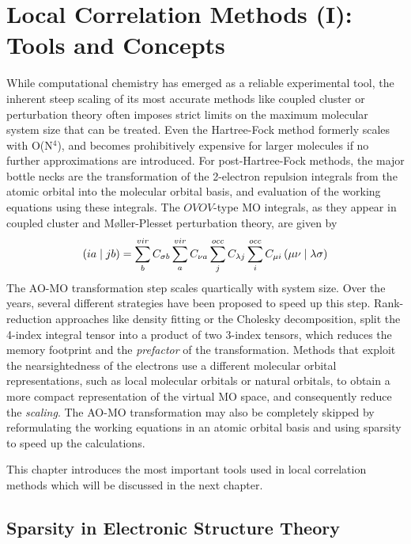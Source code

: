 \chapter{Local Correlation Methods (I): Tools and Concepts \label{cha:LOCAL0}}

While computational chemistry has emerged as a reliable experimental tool, the inherent steep scaling of its most accurate methods like coupled cluster or perturbation theory often imposes strict limits on the maximum molecular system size that can be treated. Even the Hartree-Fock method formerly scales with O(N$^4$), and becomes prohibitively expensive for larger molecules if no further approximations are introduced. For post-Hartree-Fock methods, the major bottle necks are the transformation of the 2-electron repulsion integrals from the atomic orbital into the molecular orbital basis, and evaluation of the working equations using these integrals. The $OVOV$-type MO integrals, as they appear in coupled cluster and M{\o}ller-Plesset perturbation theory, are given by
\begin{equation}
\left( ia \mid jb \right) = \sum^{vir}_b C_{\sigma b} \sum^{vir}_a C_{\nu a} \sum^{occ}_j C_{\lambda j} \sum^{occ}_i C_{\mu i} \left( \mu\nu \mid \lambda\sigma \right)
\end{equation}
The AO-MO transformation step scales quartically with system size. Over the years, several different strategies have been proposed to speed up this step. Rank-reduction approaches like density fitting or the Cholesky decomposition, split the 4-index integral tensor into a product of two 3-index tensors, which reduces the memory footprint and the \emph{prefactor} of the transformation. Methods that exploit the nearsightedness of the electrons use a different molecular orbital representations, such as local molecular orbitals or natural orbitals, to obtain a more compact representation of the virtual MO space, and consequently reduce the \emph{scaling}. The AO-MO transformation may also be completely skipped by reformulating the working equations in an atomic orbital basis and using sparsity to speed up the calculations.

This chapter introduces the most important tools used in local correlation methods which will be discussed in the next chapter.

\section{Sparsity in Electronic Structure Theory}

